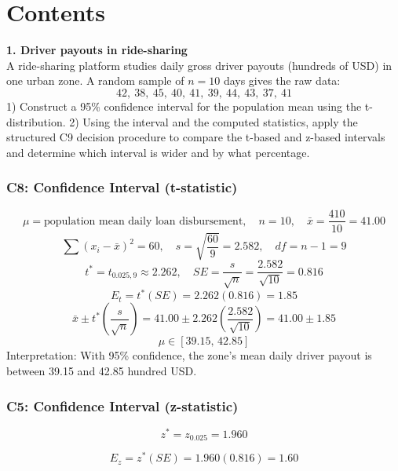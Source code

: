 


\section*{Contents}
\setcounter{tocdepth}{2}
\setcounter{secnumdepth}{1}
\tableofcontents
	\begin{ExamProblems}
		\item
		\textbf{1. Driver payouts in ride-sharing}\\
		A ride-sharing platform studies daily gross driver payouts (hundreds of USD) in one urban zone.
		A random sample of $n=10$ days gives the raw data:
		\[
		42,\ 38,\ 45,\ 40,\ 41,\ 39,\ 44,\ 43,\ 37,\ 41
		\]
		1) Construct a 95\% confidence interval for the population mean using the t-distribution.
		2) Using the interval and the computed statistics, apply the structured C9 decision procedure to compare the t-based and z-based intervals and determine which interval is wider and by what percentage.

		\subsubsection*{C8: Confidence Interval (t-statistic)}
		\[
		\mu=\text{population mean daily loan disbursement},\quad n=10,\quad \bar{x}=\frac{410}{10}=41.00
		\]
		\[
		\sum (x_i-\bar{x})^2=60,\quad s=\sqrt{\frac{60}{9}}=2.582,\quad df=n-1=9
		\]
		\[
		t^*=t_{0.025,9}\approx 2.262,\quad SE=\frac{s}{\sqrt{n}}=\frac{2.582}{\sqrt{10}}=0.816
		\]
		\[
		E_t=t^*(SE)=2.262(0.816)=1.85
		\]
		\[
		\bar{x}\pm t^*\left(\frac{s}{\sqrt{n}}\right)=41.00\pm 2.262\left(\frac{2.582}{\sqrt{10}}\right)=41.00\pm 1.85
		\]
		\[
		\mu\in[39.15,\,42.85]
		\]
		Interpretation: With 95\% confidence, the zone's mean daily driver payout is between 39.15 and 42.85 hundred USD.

		\subsubsection*{C5: Confidence Interval (z-statistic)}
		\[
		z^*=z_{0.025}=1.960
		\]

		\[
		E_z=z^*(SE)=1.960(0.816)=1.60
		\]


\end{ExamProblems}

